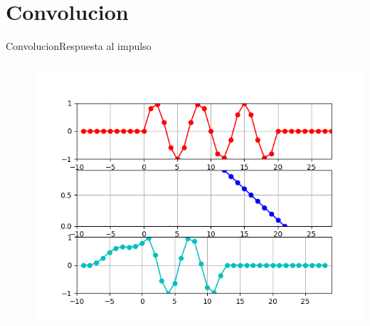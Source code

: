 \section{Convolucion}
\begin{frame}{Convolucion}{Respuesta al impulso}
   \begin{columns}[c]
      \hspace{5pt}
      \begin{column}{.3\textwidth}
         
      \end{column}
      \hspace{2pt}
      \vrule
      \hspace{2pt}
      \begin{column}{.3\textwidth}
         
      \end{column}
      \hspace{2pt}
      \vrule
      \hspace{2pt}
      \begin{column}{.38\textwidth}
         \centering\includegraphics[width=1.0\textwidth]{4_clase/conv1}
      \end{column}
      \hspace{2pt}
   \end{columns}
   \vfill
\end{frame}
